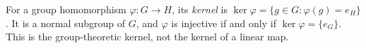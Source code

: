 
For a group homomorphism $\varphi:G\to H$, its \emph{kernel} is $\ker\varphi=\{g\in G:\varphi(g)=e_H\}$. It is a normal subgroup of $G$, and $\varphi$ is injective if and only if $\ker\varphi=\{e_G\}$. This is the group-theoretic kernel, not the kernel of a linear map.
